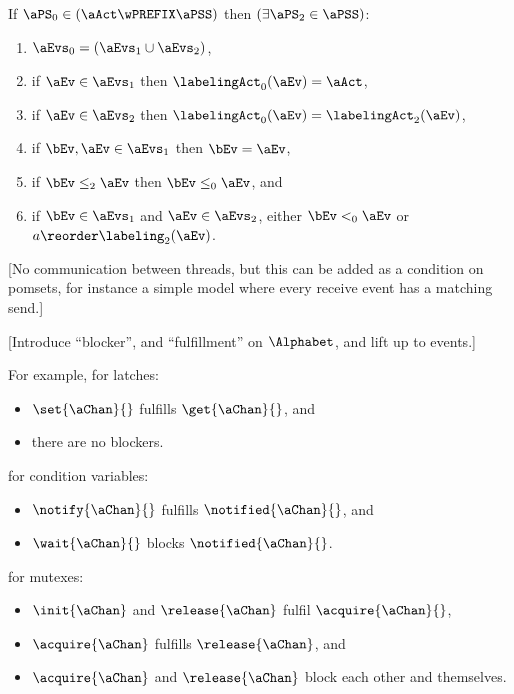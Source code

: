 \begin{definition}
  \noindent
  If $\aPS_0 \in (\aAct\wPREFIX\aPSS)$ then
  $(\exists\aPS_2\in\aPSS)$:
  \begin{enumerate}
  \item $\aEvs_0=(\aEvs_1 \cup \aEvs_2)$,
  \item if $\aEv\in\aEvs_1$ then $\labelingAct_0(\aEv) = \aAct$,
  \item if $\aEv\in\aEvs_2$ then $\labelingAct_0(\aEv) = \labelingAct_2(\aEv)$,
  \item if $\bEv,\aEv\in\aEvs_1$ then $\bEv=\aEv$,
  \item if $\bEv\le_2\aEv$ then $\bEv\le_0\aEv$, and
    \setcounter{pomsetPrefixXount}{\value{enumi}}
  \item if $\bEv\in\aEvs_1$ and $\aEv\in\aEvs_2$, either $\bEv<_0\aEv$ or $a\reorder\labeling_2(\aEv)$.
    \setcounter{pomsetPrefixOrderXount}{\value{enumi}}
  \end{enumerate}
\label{tab:pomsets}
\end{definition}

[No communication between threads, but this can be added as a condition on pomsets,
  for instance a simple model where every receive event has a matching send.]

[Introduce ``blocker'', and ``fulfillment'' on $\Alphabet$, and lift up to events.]

For example, for latches:
\begin{itemize}
\item $\set{\aChan}{}$ fulfills $\get{\aChan}{}$, and
\item there are no blockers.
\end{itemize}
for condition variables:
\begin{itemize}
\item $\notify{\aChan}{}$ fulfills $\notified{\aChan}{}$, and
\item $\wait{\aChan}{}$ blocks $\notified{\aChan}{}$.
\end{itemize}
for mutexes:
\begin{itemize}
\item $\init{\aChan}$ and $\release{\aChan}$ fulfil $\acquire{\aChan}{}$,
\item $\acquire{\aChan}$ fulfills $\release{\aChan}$, and
\item $\acquire{\aChan}$ and $\release{\aChan}$ block each other and themselves. 
\end{itemize}
  
